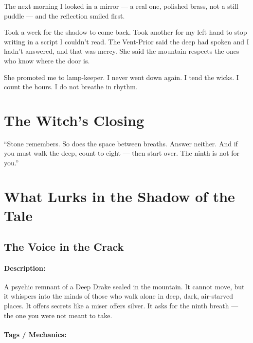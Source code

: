 The next morning I looked in a mirror --- a real one, polished brass, not a still puddle --- and the reflection smiled first.

Took a week for the shadow to come back. Took another for my left hand to stop writing in a script I couldn't read. The Vent-Prior said the deep had spoken and I hadn't answered, and that was mercy. She said the mountain respects the ones who know where the door is.

She promoted me to lamp-keeper. I never went down again. I tend the wicks. I count the hours. I do not breathe in rhythm.

\section*{The Witch's Closing}

``Stone remembers. So does the space between breaths. Answer neither. And if you must walk the deep, count to eight --- then start over. The ninth is not for you.''

\section*{What Lurks in the Shadow of the Tale}

\subsection*{The Voice in the Crack}

\paragraph{Description:}

A psychic remnant of a Deep Drake sealed in the mountain. It cannot move, but it whispers into the minds of those who walk alone in deep, dark, air-starved places. It offers secrets like a miser offers silver. It asks for the ninth breath --- the one you were not meant to take.

\paragraph{Tags / Mechanics:}

